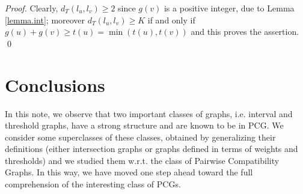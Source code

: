 \documentclass{elsarticle}
\begin{document}
\begin{doublespace}
\begin{proof}
Clearly, $d_T(l_u, l_v) \geq 2$ since $g(v)$ is a positive integer, due to Lemma \ref{lemma.int}; moreover $d_T(l_u, l_v) \geq K$ if and only if  $g(u)+g(v) \geq  t(u)=\min{(t(u), t(v))}$ and this proves the assertion. \qed
\end{proof}


\section{Conclusions}

In this note, we observe that two important classes of graphs, i.e. interval and threshold graphs, have a strong structure and are known to be in PCG.
We consider some superclasses of these classes, obtained by generalizing their definitions (either intersection graphs or graphs defined in terms of weights and thresholds) and we studied them w.r.t. the class of Pairwise Compatibility Graphs.
In this way, we have moved one step ahead toward the full comprehension of the interesting class of PCGs.

\end{doublespace}
\end{document}
